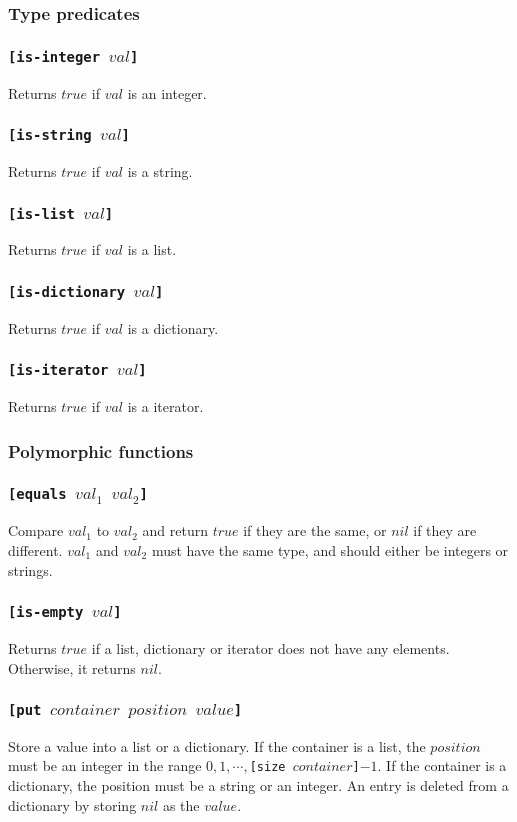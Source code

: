 \documentclass[11pt]{report}
\begin{document}
\subsubsection{Type predicates}
\subsubsection*{\tt{[is-integer }$val$\tt{]}}
Returns $true$ if $val$ is an integer.
\subsubsection*{\tt{[is-string }$val$\tt{]}}
Returns $true$ if $val$ is a string.
\subsubsection*{\tt{[is-list }$val$\tt{]}}
Returns $true$ if $val$ is a list.
\subsubsection*{\tt{[is-dictionary }$val$\tt{]}}
Returns $true$ if $val$ is a dictionary.
\subsubsection*{\tt{[is-iterator }$val$\tt{]}}
Returns $true$ if $val$ is a iterator.

\subsubsection{Polymorphic functions}
\subsubsection*{\tt{[equals }$val_1$ $val_2$\tt{]}}
Compare $val_1$ to $val_2$ and return $true$ if they are the same, or $nil$ if they are different. $val_1$ and $val_2$ must have the same type, and should either be integers or strings.
\subsubsection*{\tt{[is-empty }$val$\tt{]}}
Returns $true$ if a list, dictionary or iterator does not have any elements. Otherwise, it returns $nil$.
\subsubsection*{\tt{[put }$container$ $position$ $value$\tt{]}}
Store a value into a list or a dictionary. If the container is a list, the $position$ must be an integer in the range $0,1, \cdots, ${\tt{[size }}$container${\tt{]}}$-1$.
If the container is a dictionary, the position must be a string or an integer. An entry is deleted from a dictionary by storing $nil$ as the $value$.
\end{document}
